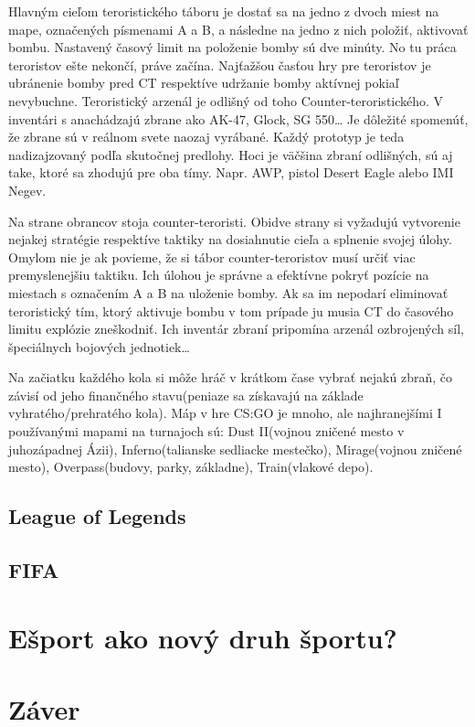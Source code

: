 \documentclass[10pt,oneside,slovak,a4paper]{article}
\begin{document}
Hlavným cieľom teroristického táboru je dostať sa na jedno z dvoch miest na mape, označených písmenami A a B, a následne na jedno z nich položiť, aktivovať bombu. Nastavený časový limit na položenie bomby sú dve minúty. No tu práca teroristov ešte nekončí, práve začína. Najťažšou časťou hry pre teroristov je ubránenie bomby pred CT respektíve udržanie bomby aktívnej pokiaľ nevybuchne. Teroristický arzenál je odlišný od toho Counter-teroristického. V inventári s anachádzajú zbrane ako AK-47, Glock, SG 550… Je dôležité spomenúť, že zbrane sú v reálnom svete naozaj vyrábané. Každý prototyp je teda nadizajzovaný podľa skutočnej predlohy. Hoci je väčšina zbraní odlišných, sú aj take, ktoré sa zhodujú pre oba tímy. Napr. AWP, pistol Desert Eagle alebo IMI Negev.\cite{a1}

Na strane obrancov stoja counter-teroristi. Obidve strany si vyžadujú vytvorenie nejakej stratégie respektíve taktiky na dosiahnutie cieľa a splnenie svojej úlohy. Omylom nie je ak povieme, že si tábor counter-teroristov musí určiť viac premyslenejšiu taktiku. Ich úlohou je správne a efektívne pokryť pozície na miestach s označením A a B na uloženie bomby. Ak sa im nepodarí eliminovať teroristický tím, ktorý aktivuje bombu v tom prípade ju musia CT do časového limitu explózie zneškodniť. Ich inventár zbraní pripomína arzenál ozbrojených síl, špeciálnych bojových jednotiek…\cite{a1} 

Na začiatku každého kola si môže hráč v krátkom čase vybrať nejakú zbraň, čo závisí od jeho finančného stavu(peniaze sa získavajú na základe vyhratého/prehratého kola). Máp v hre CS:GO je mnoho, ale najhranejšími I používanými mapami na turnajoch sú: Dust II(vojnou zničené mesto v juhozápadnej Ázii), Inferno(talianske sedliacke mestečko), Mirage(vojnou zničené mesto), Overpass(budovy, parky, základne), Train(vlakové depo).\cite{a1}


\subsection{League of Legends} \label{hry:lol}

\subsection{FIFA} \label{hry:fifa}

\section{Ešport ako nový druh športu?} \label{esportakosport}

\section{Záver} \label{zaver} %





\end{document}
